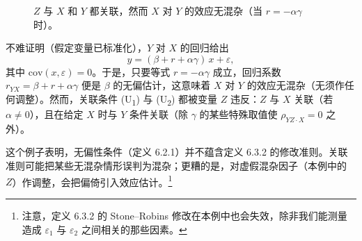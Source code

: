 \begin{figure}[htbp]
\centering
{}
\caption{$Z$ 与 $X$ 和 $Y$ 都关联，然而 $X$ 对 $Y$ 的效应无混杂（当 $r=-\alpha\gamma$ 时）。}
\label{fig:6.4}
\end{figure}

不难证明（假定变量已标准化），$Y$ 对 $X$ 的回归给出
\[
y = (\beta + r + \alpha\gamma)\,x + \varepsilon,
\]
其中 $\mathrm{cov}(x,\varepsilon)=0$。于是，只要等式 $r=-\alpha\gamma$ 成立，回归系数 $r_{YX}=\beta+r+\alpha\gamma$ 便是 $\beta$ 的无偏估计，这意味着 $X$ 对 $Y$ 的效应无混杂（无须作任何调整）。然而，关联条件 (U\textsubscript{1}) 与 (U\textsubscript{2}) 都被变量 $Z$ 违反：$Z$ 与 $X$ 关联（若 $\alpha\ne 0$），且在给定 $X$ 时与 $Y$ 条件关联（除 $\gamma$ 的某些特殊取值使 $\rho_{YZ\cdot X}=0$ 之外）。

这个例子表明，无偏性条件（定义 6.2.1）并不蕴含定义 6.3.2 的修改准则。关联准则可能把某些无混杂情形误判为混杂；更糟的是，对虚假混杂因子（本例中的 $Z$）作调整，会把偏倚引入效应估计。\footnote{注意，定义 6.3.2 的 Stone–Robins 修改在本例中也会失效，除非我们能测量造成 $\varepsilon_1$ 与 $\varepsilon_2$ 之间相关的那些因素。}
